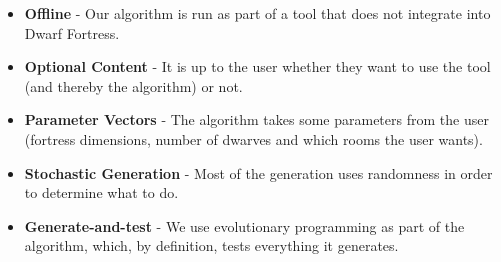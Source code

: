 \begin{itemize}

	\item \textbf{Offline} - Our algorithm is run as part of a tool that does not integrate into Dwarf Fortress.

	\item \textbf{Optional Content} - It is up to the user whether they want to use the tool (and thereby the algorithm) or not.

	\item \textbf{Parameter Vectors} - The algorithm takes some parameters from the user (fortress dimensions, number of dwarves and which rooms the user wants).

	\item \textbf{Stochastic Generation} - Most of the generation uses randomness in order to determine what to do.

	\item \textbf{Generate-and-test} - We use evolutionary programming as part of the algorithm, which, by definition, tests everything it generates.

\end{itemize}









